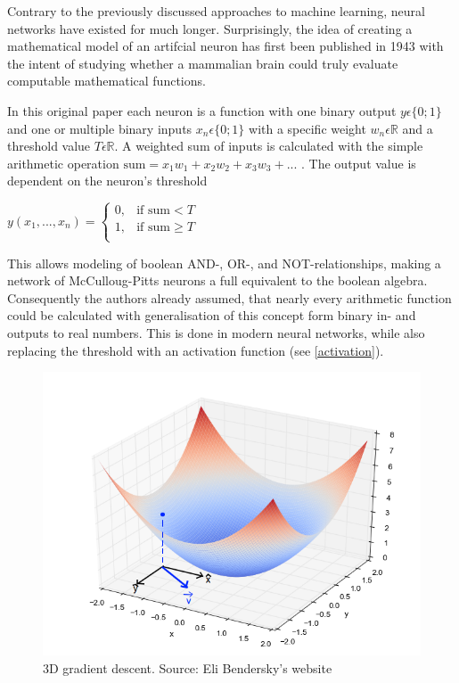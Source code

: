 Contrary to the previously discussed approaches to machine learning, neural networks have existed for much longer. Surprisingly, the idea of creating a mathematical model of an artifcial neuron has first been published in 1943 \cite{McCulloch1943} with the intent of studying whether a mammalian brain could truly evaluate computable mathematical functions.


In this original paper each neuron is a function with one binary output $y \epsilon \{0;1\}$ and one or multiple binary inputs $x_n \epsilon \{0;1\}$ with a specific weight $w_n \epsilon \mathbb{R}$ and a threshold value $T \epsilon \mathbb{R}$. A weighted sum of inputs is calculated with the simple arithmetic operation $\text{sum} = x_1w_1 + x_2w_2 + x_3w_3 + ...$ . The output value is dependent on the neuron's threshold

{\centering
	$y(x_1, ..., x_n) = \begin{cases}
    0,& \text{if } \text{sum} < T\\
    1,& \text{if } \text{sum} \geq T\\
	\end{cases}$
	\par
}

This allows modeling of boolean AND-, OR-, and NOT-relationships, making a network of McCulloug-Pitts neurons a full equivalent to the boolean algebra. Consequently the authors already assumed, that nearly every arithmetic function could be calculated with generalisation of this concept form binary in- and outputs to real numbers. This is done in modern neural networks, while also replacing the threshold with an activation function (see \ref{activation}).

\begin{figure}
  \vspace{-25pt}
    \centering
	\includegraphics[width=.45\textwidth]{./images/illustrations/gradient-descent}
    \caption{3D gradient descent. Source: Eli Bendersky's website}
    \label{fig:gradient-descent}
      \vspace{-15pt}
\end{figure}


